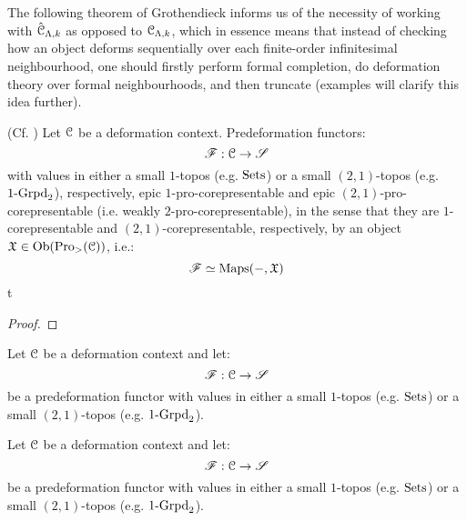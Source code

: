             The following theorem of Grothendieck informs us of the necessity of working with $\hat{\mathcal{C}}_{\Lambda, k}$ as opposed to $\mathcal{C}_{\Lambda, k}$, which in essence means that instead of checking how an object deforms sequentially over each finite-order infinitesimal neighbourhood, one should firstly perform formal completion, do deformation theory over formal neighbourhoods, and then truncate (examples will clarify this idea further). 
            \begin{theorem}  \label{theorem: predeformation_functors_are_pro_corepresentable}
                (Cf. \cite[Proposition 3.1]{grothendieck_fga_2}) Let $\mathcal{C}$ be a deformation context. Predeformation functors:
                    $$\mathscr{F}: \mathcal{C} \to \mathscr{S}$$
                with values in either a small $1$-topos (e.g. $\mathrm{Sets}$) or a small $(2, 1)$-topos (e.g. $1\text{-}\mathrm{Grpd}_2$), respectively, epic $1$-pro-corepresentable and epic $(2, 1)$-pro-corepresentable (i.e. weakly $2$-pro-corepresentable), in the sense that they are $1$-corepresentable and $(2, 1)$-corepresentable, respectively, by an object $\mathfrak{X} \in \mathrm{Ob}(\mathrm{Pro}_{>}(\mathcal{C}))$, i.e.:
                    $$\mathscr{F} \simeq \mathrm{Maps}(-, \mathfrak{X})$$t
            \end{theorem}
                \begin{proof}
                    
                \end{proof}
            \begin{corollary}
                Let $\mathcal{C}$ be a deformation context and let:
                    $$\mathscr{F}: \mathcal{C} \to \mathscr{S}$$
                be a predeformation functor with values in either a small $1$-topos (e.g. $\mathrm{Sets}$) or a small $(2, 1)$-topos (e.g. $1\text{-}\mathrm{Grpd}_2$). 
            \end{corollary}
            \begin{convention}
                Let $\mathcal{C}$ be a deformation context and let:
                    $$\mathscr{F}: \mathcal{C} \to \mathscr{S}$$
                be a predeformation functor with values in either a small $1$-topos (e.g. $\mathrm{Sets}$) or a small $(2, 1)$-topos (e.g. $1\text{-}\mathrm{Grpd}_2$). 
            \end{convention}
    
